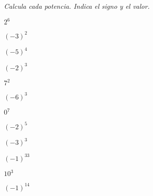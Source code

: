 {\small\textit{Calcula cada potencia. Indica el signo y el valor.}}
\begin{BloqueEjercicios}
  \begin{ej3col}
    \item $2^6$
    \item $(-3)^2$
    \item $(-5)^4$
    \item $(-2)^3$
    \item $7^2$
    \item $(-6)^3$
    \item $0^7$
    \item $(-2)^5$
    \item $(-3)^3$
    \item $(-1)^{33}$
    \item $10^3$
    \item $(-1)^{14}$
  \end{ej3col}
\end{BloqueEjercicios}
